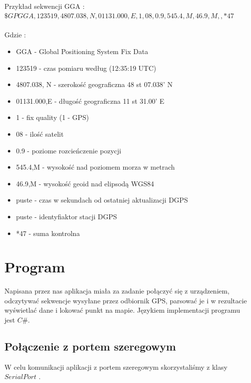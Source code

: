 \documentclass[wide,a4paper,titlepage,12pt] {article}
\begin{document}
\paragraph{}
Przykład sekwencji GGA : \\
$\$GPGGA,123519,4807.038,N,01131.000,E,1,08,0.9,545.4,M,46.9,M,,*47$ 
\paragraph{}
Gdzie :
\begin{itemize}
	\item GGA - Global Positioning System Fix Data
	\item 123519 - czas pomiaru według (12:35:19 UTC)
	\item 4807.038, N - szerokość geograficzna 48 st 07.038' N
	\item 01131.000,E - długość geograficzna 11 st 31.00' E
	\item 1 - fix quality (1 - GPS)
	\item 08 - ilość satelit
	\item 0.9 - poziome rozcieńczenie pozycji
	\item 545.4,M - wysokość nad poziomem morza w metrach
	\item 46.9,M - wysokość geoid nad elipsodą WGS84
	\item puste -  czas w sekundach od ostatniej aktualizacji DGPS
	\item puste - identyfiaktor stacji DGPS
	\item *47 - suma kontrolna
\end{itemize}

\section{Program}
\paragraph{}
Napisana przez nas aplikacja miała za zadanie połączyć się z urządzeniem, odczytywać sekwencje wysyłane przez odbiornik GPS, parsować je i w rezultacie wyświetlać dane i lokować punkt na mapie. Językiem implementacji programu jest $C\#$.
\subsection{Połączenie z portem szeregowym}
W celu komunikacji aplikacji z portem szeregowym skorzystaliśmy z klasy $SerialPort$ .
\end{document}
